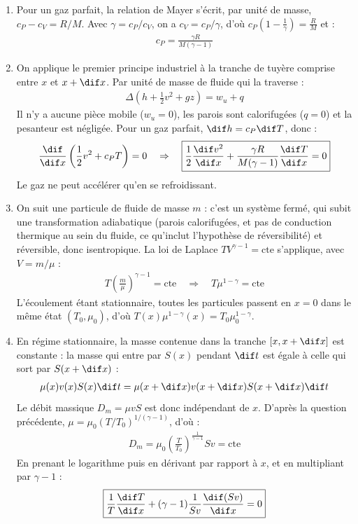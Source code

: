 \begin{correction}

\begin{enumerate}

	\item Pour un gaz parfait, la relation de Mayer s'écrit, par unité de masse, $c_P-c_V=R/M$. Avec $\gamma=c_P/c_V$, on a $c_V=c_P/\gamma$, d'où $c_P\left(1-\frac{1}{\gamma}\right)=\frac{R}{M}$ et :
	\begin{align*}
		\boxed{c_P=\frac{\gamma R}{M(\gamma-1)}}
	\end{align*}

	\item On applique le premier principe industriel à la tranche de tuyère comprise entre $x$ et $x+\dif x$. Par unité de masse de fluide qui la traverse :
	\begin{align*}
		\Delta\left(h+\frac{1}{2}v^2+gz\right)=w_u+q
	\end{align*}
	Il n'y a aucune pièce mobile ($w_u=0$), les parois sont calorifugées ($q=0$) et la pesanteur est négligée. Pour un gaz parfait, $\dif h=c_P\dif T$, donc :
	\begin{align*}
		\frac{\dif}{\dif x}\left(\frac{1}{2}v^2+c_PT\right)=0 \quad\Rightarrow\quad \boxed{\frac{1}{2}\frac{\dif v^2}{\dif x}+\frac{\gamma R}{M(\gamma-1)}\frac{\dif T}{\dif x}=0}
	\end{align*}
	Le gaz ne peut accélérer qu'en se refroidissant.

	\item On suit une particule de fluide de masse $m$ : c'est un système fermé, qui subit une transformation adiabatique (parois calorifugées, et pas de conduction thermique au sein du fluide, ce qu'inclut l'hypothèse de réversibilité) et réversible, donc isentropique. La loi de Laplace $TV^{\gamma-1}=\text{cte}$ s'applique, avec $V=m/\mu$ :
	\begin{align*}
		T\left(\frac{m}{\mu}\right)^{\gamma-1}=\text{cte} \quad\Rightarrow\quad T\mu^{1-\gamma}=\text{cte}
	\end{align*}
	L'écoulement étant stationnaire, toutes les particules passent en $x=0$ dans le même état $(T_0,\mu_0)$, d'où $T(x)\mu^{1-\gamma}(x)=T_0\mu_0^{1-\gamma}$.

	\item En régime stationnaire, la masse contenue dans la tranche $[x,x+\dif x]$ est constante : la masse qui entre par $S(x)$ pendant $\dif t$ est égale à celle qui sort par $S(x+\dif x)$ :
	\begin{align*}
		\mu(x)v(x)S(x)\dif t=\mu(x+\dif x)v(x+\dif x)S(x+\dif x)\dif t
	\end{align*}
	Le débit massique $D_m=\mu vS$ est donc indépendant de $x$. D'après la question précédente, $\mu=\mu_0(T/T_0)^{1/(\gamma-1)}$, d'où :
	\begin{align*}
		D_m=\mu_0\left(\frac{T}{T_0}\right)^{\frac{1}{\gamma-1}}Sv=\text{cte}
	\end{align*}
	En prenant le logarithme puis en dérivant par rapport à $x$, et en multipliant par $\gamma-1$ :
	\begin{align*}
		\boxed{\frac{1}{T}\frac{\dif T}{\dif x}+(\gamma-1)\frac{1}{Sv}\frac{\dif (Sv)}{\dif x}=0}
	\end{align*}


\end{enumerate}
\end{correction}
